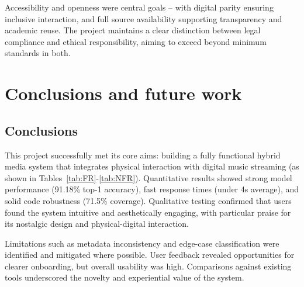             Accessibility and openness were central goals -- with digital parity ensuring inclusive interaction, and full source availability supporting transparency and academic reuse. The project maintains a clear distinction between legal compliance and ethical responsibility, aiming to exceed beyond minimum standards in both.
    
    \section{Conclusions and future work} %
        \subsection{Conclusions}
    
            This project successfully met its core aims: building a fully functional hybrid media system that integrates physical interaction with digital music streaming (as shown in Tables~\ref{tab:FR}-\ref{tab:NFR}). Quantitative results showed strong model performance (91.18\% top-1 accuracy), fast response times (under 4s average), and solid code robustness (71.5\% coverage). Qualitative testing confirmed that users found the system intuitive and aesthetically engaging, with particular praise for its nostalgic design and physical-digital interaction.
    
            Limitations such as metadata inconsistency and edge-case classification were identified and mitigated where possible. User feedback revealed opportunities for clearer onboarding, but overall usability was high. Comparisons against existing tools underscored the novelty and experiential value of the system.
    
            \begingroup
                \renewcommand\thefootnote{}
                \addtocounter{footnote}{-1}
            \endgroup
    
